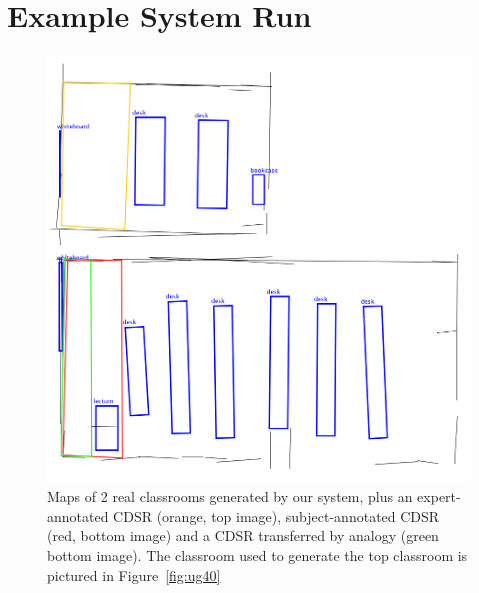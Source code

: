 \documentclass[letterpaper]{article}
\begin{document}
\section{Example System Run}\label{sec:example}




\begin{figure}
  \includegraphics[width=\columnwidth]{images/worked-example-rooms.png}
  \caption{Maps of 2 real classrooms generated by our system, plus an expert-annotated CDSR (orange, top image), subject-annotated CDSR (red, bottom image) and a CDSR transferred by analogy (green bottom image). The classroom used to generate the top classroom is pictured in Figure~\ref{fig:ug40}}
  \label{fig:rooms}
\end{figure}
\end{document}
